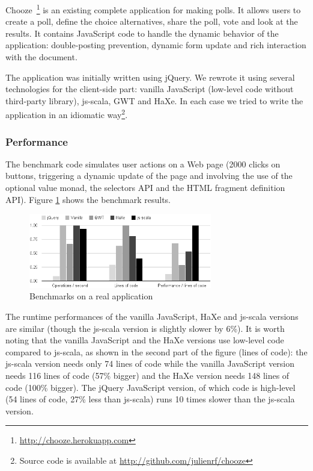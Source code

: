 \documentclass[preprint]{sigplanconf}
\begin{document}
Chooze~\footnote{\href{http://chooze.herokuapp.com}{http://chooze.herokuapp.com}} is an existing
complete application for making polls. It allows users to create a poll, define the choice
alternatives, share the poll, vote and look at the results. It contains JavaScript code to handle
the dynamic behavior of the application: double-posting prevention, dynamic form update and rich
interaction with the document.

The application was initially written using jQuery. We rewrote it using several technologies for the
client-side part: vanilla JavaScript (low-level code without third-party library), js-scala, GWT and
HaXe. In each case we tried to write the application in an idiomatic way\footnote{Source code is
available at \href{http://github.com/julienrf/chooze}{http://github.com/julienrf/chooze}}.

\subsubsection{Performance}

The benchmark code simulates user actions on a Web page (2000 clicks on buttons, triggering a
dynamic update of the page and involving the use of the optional value monad, the selectors API and
the HTML fragment definition API). Figure \ref{benchmark} shows the benchmark results.

\begin{figure}
\centering
\includegraphics[width=8cm]{chooze.png}
\caption{Benchmarks on a real application}
\label{benchmark}
\end{figure}

The runtime performances of the vanilla JavaScript, HaXe and js-scala versions are similar (though
the js-scala version is slightly slower by 6\%). It is worth noting that the vanilla JavaScript and
the HaXe versions use low-level code compared to js-scala, as shown in the second part of the figure
(lines of code): the js-scala version needs only 74 lines of code while the vanilla JavaScript
version needs 116 lines of code (57\% bigger) and the HaXe version needs 148 lines of code (100\%
bigger). The jQuery JavaScript version, of which code is high-level (54 lines of code, 27\% less
than js-scala) runs 10 times slower than the js-scala version.
\end{document}
